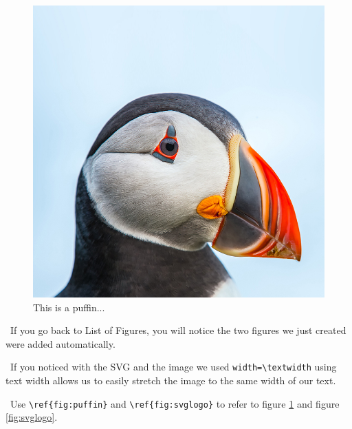 \begin{figure}[h]
    \centering
    \includegraphics[width=\textwidth]{puffin}
    \caption{This is a puffin...}
    \label{fig:puffin}
\end{figure}

\faWarning\, If you go back to List of Figures, you will notice the two figures we just created were added automatically.

\faWarning\, If you noticed with the SVG and the image we used \verb_width=\textwidth_ using text width allows us to  easily stretch the image to the same width of our text.

\faWarning\, Use \verb=\ref{fig:puffin}= and \verb=\ref{fig:svglogo}= to refer to figure \ref{fig:puffin} and figure \ref{fig:svglogo}.
\pagebreak
